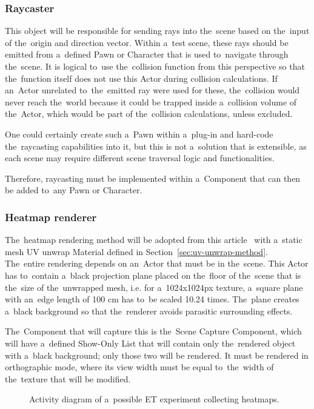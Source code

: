 \subsubsection*{Raycaster}

This object will be responsible for sending rays into the~scene based on the~input of the~origin and direction vector. Within a~test scene, these rays should be emitted from a~defined Pawn or Character that is used to~navigate through the~scene. It is logical to~use the~collision function from this perspective so that the~function itself does not use this Actor during collision calculations. If an~Actor unrelated to~the~emitted ray were used for these, the~collision would never reach the~world because it could be trapped inside a~collision volume of the~Actor, which would be part of the~collision calculations, unless excluded.

One could certainly create such a~Pawn within a~plug-in and hard-code the~raycasting capabilities into it, but this is not a~solution that is extensible, as each scene may require different scene traversal logic and functionalities.

Therefore, raycasting must be implemented within a~Component that can then be added to~any Pawn or Character.

\subsubsection*{Heatmap renderer}

The~heatmap rendering method will be adopted from this article~\cite{tran2018wenderlich} with a~static mesh UV unwrap Material defined in Section~\ref{sec:uv-unwrap-method}. The~entire rendering depends on an~Actor that must be in the~scene. This Actor has to~contain a~black projection plane placed on the~floor of the~scene that is the~size of the~unwrapped mesh, i.e. for a~1024x1024px texture, a~square plane with an~edge length of 100 cm has to~be scaled 10.24 times. The~plane creates a~black background so that the~renderer avoids parasitic surrounding effects.

The~Component that will capture this is the~Scene Capture Component, which will have a~defined Show-Only List that will contain only the~rendered object with a~black background; only those two will be rendered. It must be rendered in orthographic mode, where its view width must be equal to~the~width of the~texture that will be modified.
\pagebreak{}

\begin{figure}[p]\centering{}
    
    \caption{Activity diagram of a~possible ET experiment collecting heatmaps.}
    \label{fig:experiment-diagram}
\end{figure}